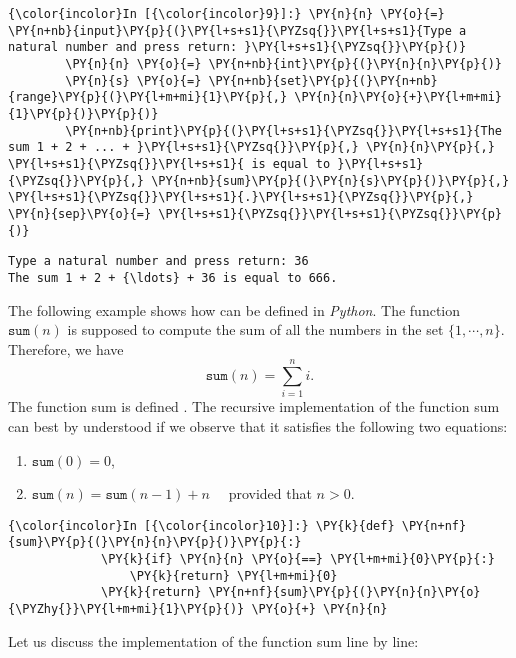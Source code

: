 \begin{Verbatim}[commandchars=\\\{\}]
{\color{incolor}In [{\color{incolor}9}]:} \PY{n}{n} \PY{o}{=} \PY{n+nb}{input}\PY{p}{(}\PY{l+s+s1}{\PYZsq{}}\PY{l+s+s1}{Type a natural number and press return: }\PY{l+s+s1}{\PYZsq{}}\PY{p}{)}
        \PY{n}{n} \PY{o}{=} \PY{n+nb}{int}\PY{p}{(}\PY{n}{n}\PY{p}{)}
        \PY{n}{s} \PY{o}{=} \PY{n+nb}{set}\PY{p}{(}\PY{n+nb}{range}\PY{p}{(}\PY{l+m+mi}{1}\PY{p}{,} \PY{n}{n}\PY{o}{+}\PY{l+m+mi}{1}\PY{p}{)}\PY{p}{)}
        \PY{n+nb}{print}\PY{p}{(}\PY{l+s+s1}{\PYZsq{}}\PY{l+s+s1}{The sum 1 + 2 + ... + }\PY{l+s+s1}{\PYZsq{}}\PY{p}{,} \PY{n}{n}\PY{p}{,} \PY{l+s+s1}{\PYZsq{}}\PY{l+s+s1}{ is equal to }\PY{l+s+s1}{\PYZsq{}}\PY{p}{,} \PY{n+nb}{sum}\PY{p}{(}\PY{n}{s}\PY{p}{)}\PY{p}{,} \PY{l+s+s1}{\PYZsq{}}\PY{l+s+s1}{.}\PY{l+s+s1}{\PYZsq{}}\PY{p}{,} \PY{n}{sep}\PY{o}{=} \PY{l+s+s1}{\PYZsq{}}\PY{l+s+s1}{\PYZsq{}}\PY{p}{)}
\end{Verbatim}

\begin{Verbatim}[commandchars=\\\{\}]
Type a natural number and press return: 36
The sum 1 + 2 + {\ldots} + 36 is equal to 666.
\end{Verbatim}

The following example shows how  can be defined in
\textsl{Python}. The function \(\texttt{sum}(n)\) is supposed to compute
the sum of all the numbers in the set \(\{1, \cdots, n\}\). Therefore, we have
 \[\texttt{sum}(n) = \sum\limits_{i=1}^n i. \]
The function sum is defined . The recursive
implementation of the function sum can best by understood if we observe
that it satisfies the following two equations:
\begin{enumerate}
\item $\texttt{sum}(0) = 0$, 
\item $\texttt{sum}(n) = \texttt{sum}(n-1) + n \quad$  provided that $n > 0$.
\end{enumerate}

    \begin{Verbatim}[commandchars=\\\{\}]
{\color{incolor}In [{\color{incolor}10}]:} \PY{k}{def} \PY{n+nf}{sum}\PY{p}{(}\PY{n}{n}\PY{p}{)}\PY{p}{:}
             \PY{k}{if} \PY{n}{n} \PY{o}{==} \PY{l+m+mi}{0}\PY{p}{:}
                 \PY{k}{return} \PY{l+m+mi}{0}
             \PY{k}{return} \PY{n+nf}{sum}\PY{p}{(}\PY{n}{n}\PY{o}{\PYZhy{}}\PY{l+m+mi}{1}\PY{p}{)} \PY{o}{+} \PY{n}{n}
\end{Verbatim}
 Let us discuss the implementation of the function sum line by line:

